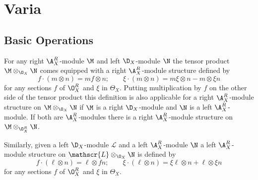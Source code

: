 \section{Varia}
\subsection{Basic Operations}\label{sec: BasicOperations}
For any right $\A_{X}^R$-module $\M$ and left $\D_X$-module $\N$ the tensor product $\M \otimes_{\O_X} \N$ comes equipped with a right $\A_X^R$-module structure defined by
$$f\cdot (m\otimes n) = mf \otimes n; \qquad \xi \cdot (m\otimes n) = m\xi \otimes n - m\otimes \xi n $$
for any sections $f$ of $\O_X^R$ and $\xi$ in $\Theta_X$. Putting multiplication by $f$ on the other side of the tensor product this definition is also applicable for a right $\A_X^R$-module structure on $\M\otimes_{\O_X} \N$ if $\M$ is a right $\D_X$-module and $\N$ is a left $\A_X^R$-module. If both are $\A_X^R$-modules there is a right $\A_X^R$-module structure on $\M\otimes_{\O_X^R} \N$.

Similarly, given a left $\D_X$-module $\mathscr{L}$ and a left $\A_X^R$-module $\N$ a left $\A_X^R$-module structure on $\mathscr{L} \otimes_{\O_X} \N$ is defined by
$$f \cdot (\ell\otimes n) =\ell \otimes fn; \qquad \xi \cdot (\ell\otimes n ) = \xi \ell \otimes n + \ell \otimes \xi n$$
for any sections $f$ of $\O_X^R$ and $\xi$ in $\Theta_X$.

